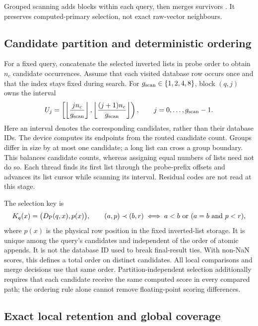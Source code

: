Grouped scanning adds blocks within each query, then merges survivors \cite{johnson_gpu}. It preserves computed-primary selection, not exact raw-vector neighbours.

\subsection{Candidate partition and deterministic ordering}

For a fixed query, concatenate the selected inverted lists in probe order
to obtain $n_c$ candidate occurrences. Assume that each visited database
row occurs once and that the index stays fixed during search. For
$g_{\mathrm{scan}}\in\{1,2,4,8\}$, block $(q,j)$ owns the interval
\begin{equation}
 U_j=\left[\left\lfloor\frac{j n_c}{g_{\mathrm{scan}}}\right\rfloor,
              \left\lfloor\frac{(j+1)n_c}{g_{\mathrm{scan}}}\right\rfloor\right),
 \qquad j=0,\ldots,g_{\mathrm{scan}}-1.
 \label{eq:5-partition}
\end{equation}
Here an interval denotes the corresponding candidates, rather than their
database IDs. The device computes its endpoints from the routed candidate
count. Groups differ in size by at most one candidate; a long list can
cross a group boundary. This balances candidate counts, whereas assigning
equal numbers of lists need not do so. Each thread finds its first list
through the probe-prefix offsets and advances its list cursor while
scanning its interval. Residual codes are not read at this stage.

The selection key is
\begin{equation}
 K_q(x)=\bigl(D_{\mathrm{P}}(q,x),p(x)\bigr),
 \qquad
 (a,p)\prec(b,r)\iff a<b\ \text{or}\ (a=b\ \text{and}\ p<r),
 \label{eq:5-primary-key}
\end{equation}
where $p(x)$ is the physical row position in the fixed inverted-list
storage. It is unique among the query's candidates and independent of
the order of atomic appends. It is not the database ID used to break
final-result ties. With non-NaN scores, this defines a total order on
distinct candidates. All local comparisons and merge decisions use that
same order. Partition-independent selection additionally requires that
each candidate receive the same computed score in every compared path;
the ordering rule alone cannot remove floating-point scoring differences.

\subsection{Exact local retention and global coverage}

